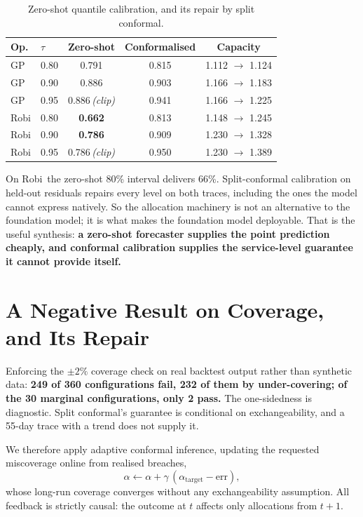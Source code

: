 \documentclass[conference]{IEEEtran}
\newcommand{\gpx}{GP}
\newcommand{\robix}{Robi}
\begin{document}
\begin{table}[htbp]
\caption{Zero-shot quantile calibration, and its repair by split conformal.}
\label{tab:zsq}
\centering
\setlength{\tabcolsep}{4pt}
\begin{tabular}{llccc}
\toprule
\textbf{Op.} & $\tau$ & \textbf{Zero-shot} & \textbf{Conformalised} & \textbf{Capacity} \\
\midrule
\gpx & 0.80 & 0.791 & 0.815 & 1.112 $\rightarrow$ 1.124 \\
\gpx & 0.90 & 0.886 & 0.903 & 1.166 $\rightarrow$ 1.183 \\
\gpx & 0.95 & 0.886\,\emph{(clip)} & 0.941 & 1.166 $\rightarrow$ 1.225 \\
\robix & 0.80 & \textbf{0.662} & 0.813 & 1.148 $\rightarrow$ 1.245 \\
\robix & 0.90 & \textbf{0.786} & 0.909 & 1.230 $\rightarrow$ 1.328 \\
\robix & 0.95 & 0.786\,\emph{(clip)} & 0.950 & 1.230 $\rightarrow$ 1.389 \\
\bottomrule
\end{tabular}
\end{table}

On \robix\ the zero-shot 80\% interval delivers 66\%. Split-conformal calibration on
held-out residuals repairs every level on both traces, including the ones the model
cannot express natively. So the allocation machinery is not an alternative to the
foundation model; it is what makes the foundation model deployable. That is the useful
synthesis: \textbf{a zero-shot forecaster supplies the point prediction cheaply, and
conformal calibration supplies the service-level guarantee it cannot provide itself.}

\section{A Negative Result on Coverage, and Its Repair}
\label{sec:cov}

Enforcing the $\pm 2\%$ coverage check on real backtest output rather than synthetic
data: \textbf{249 of 360 configurations fail, 232 of them by under-covering; of the 30
marginal configurations, only 2 pass.} The one-sidedness is diagnostic. Split
conformal's guarantee is conditional on exchangeability, and a 55-day trace with a
trend does not supply it.

We therefore apply adaptive conformal inference, updating the requested miscoverage
online from realised breaches,
\begin{equation}
\alpha \leftarrow \alpha + \gamma\,(\alpha_{\mathrm{target}} - \mathrm{err}),
\end{equation}
whose long-run coverage converges without any exchangeability assumption. All feedback
is strictly causal: the outcome at $t$ affects only allocations from $t+1$.
\end{document}
